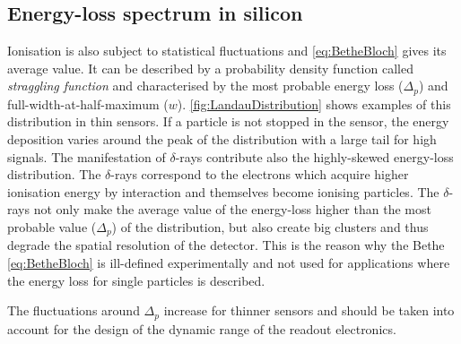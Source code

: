 \subsection{Energy-loss spectrum in silicon}
\label{sec:SiliconEnergyLossSpectrum}
Ionisation is also subject to statistical fluctuations and
\cref{eq:BetheBloch} gives its average value. It can be described by a
probability density function called \textit{straggling function} and
characterised by the most probable energy loss ($\Delta_{p}$) and
full-width-at-half-maximum ($w$). \cref{fig:LandauDistribution} shows
examples of this distribution in thin sensors. If a particle is not
stopped in the sensor, the energy deposition varies around the peak of
the distribution with a large tail for high signals. The manifestation
of $\delta$-rays contribute also the highly-skewed energy-loss
distribution. The $\delta$-rays correspond to the electrons which
acquire higher ionisation energy by interaction and themselves become
ionising particles. The $\delta$-rays not only make the average value
of the energy-loss higher than the most probable value ($\Delta_{p}$)
of the distribution, but also create big clusters and thus degrade the
spatial resolution of the detector. This is the reason why the Bethe
\cref{eq:BetheBloch} is ill-defined experimentally and not used for
applications where the energy loss for single particles is described.

The fluctuations around $\Delta_{p}$ increase for thinner sensors and
should be taken into account for the design of the dynamic range of
the readout electronics.


